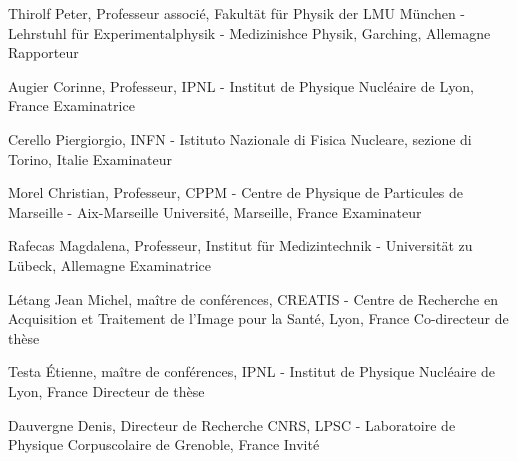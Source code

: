 Thirolf Peter, Professeur associ\'{e}, Fakult\"{a}t f\"{u}r Physik der LMU M\"{u}nchen - Lehrstuhl f\"{u}r Experimentalphysik - Medizinishce Physik, Garching, Allemagne \newline \hfill Rapporteur

Augier Corinne, Professeur, IPNL - Institut de Physique Nucl\'{e}aire de Lyon, France \newline \hfill Examinatrice

Cerello Piergiorgio, INFN - Istituto Nazionale di Fisica Nucleare, sezione di Torino, Italie \newline \hfill Examinateur

Morel Christian, Professeur, CPPM - Centre de Physique de Particules de Marseille - Aix-Marseille Universit\'{e}, Marseille, France \newline \hfill Examinateur

Rafecas Magdalena, Professeur, Institut f\"{u}r Medizintechnik - Universit\"{a}t zu L\"{u}beck, Allemagne \newline \hfill Examinatrice

\bigskip

L\'{e}tang Jean Michel, ma\^{i}tre de conf\'{e}rences, CREATIS - Centre de Recherche en Acquisition et Traitement de l'Image pour la Sant\'{e}, Lyon, France \newline \hfill Co-directeur de th\`{e}se %

Testa \'{E}tienne, ma\^{i}tre de conf\'{e}rences, IPNL - Institut de Physique Nucl\'{e}aire de Lyon, France \newline  \hfill Directeur de th\`{e}se

\bigskip

Dauvergne Denis, Directeur de Recherche CNRS, LPSC - Laboratoire de Physique Corpuscolaire de Grenoble, France \newline  \hfill Invit\'{e} %

\newpage

%